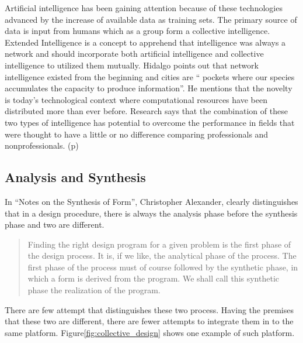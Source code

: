 Artificial intelligence has been gaining attention because of these
technologies advanced by the increase of available data as training sets.
The primary source of data is input from humans which as a group form a
collective intelligence. Extended Intelligence is a concept to apprehend
that intelligence was always a network and should incorporate both
artificial intelligence and collective intelligence to utilized them
mutually.\cite{pubpub:extended}
Hidalgo points out that network intelligence existed from the beginning and
cities are `` pockets where our species accumulates the capacity to produce
information''.\cite{hidalgo2015information} He mentions that the novelty
is today's technological context where computational resources have been
distributed more than ever before.\cite{pubpub:whatsnew}
Research says that the combination of these two types of
intelligence has potential to overcome the
performance\cite{baharad2011distilling}
in fields that were thought to have a little or no difference comparing
professionals and nonprofessionals. (p\pageref{subsec:wicked})

\subsection{Analysis and Synthesis}

In ``Notes on the Synthesis of Form'', Christopher Alexander, clearly
distinguishes that in a design procedure, there is always the analysis
phase before the synthesis phase and two are different.

\begin{quotation}
  Finding the right design program for a given problem is the first phase
  of the design process. It is, if we like, the analytical phase of the
  process. The first phase of the process must of course followed by the
  synthetic phase, in which a form is derived from the program. We shall
  call this synthetic phase the realization of the program.\cite{alexander1964notes}
\end{quotation}

There are few attempt that distinguishes these two process. Having the
premises that these two are different, there are fewer attempts to integrate
them in to the same platform. Figure\ref{fig:collective_design} shows one
example of such platform. 

